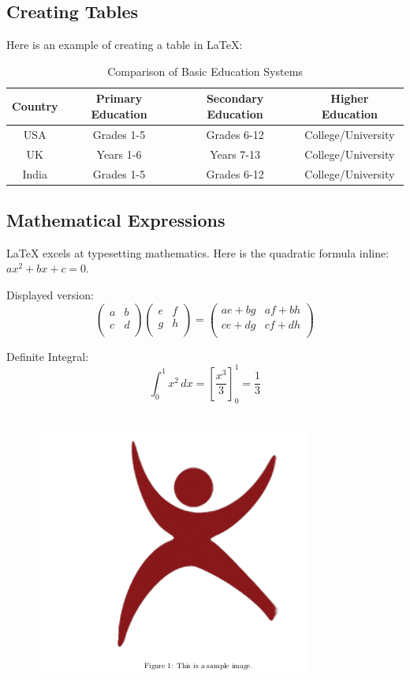 \documentclass{article}
\begin{document}
	
	\subsection{Creating Tables}
	Here is an example of creating a table in \LaTeX:
	\begin{table}[h]
		\centering
		\begin{tabular}{|c|c|c|c|}
			\hline
			Country & Primary Education & Secondary Education  &  Higher Education\\
			\hline
			USA & Grades 1-5 & Grades 6-12 & College/University \\
			\hline
			UK & Years 1-6 & Years 7-13 & College/University\\
			\hline
			India & Grades 1-5 & Grades 6-12& College/University \\
			\hline
		\end{tabular}
		\caption{Comparison of Basic Education Systems}
	\end{table}
		
	
	\subsection{Mathematical Expressions}
	LaTeX excels at typesetting mathematics. Here is the quadratic formula inline: \( ax^2 + bx + c = 0 \).
	
	Displayed version: 
	\[
	\begin{pmatrix}
		a & b \\
		c & d \\
	\end{pmatrix}
	\begin{pmatrix}
		e & f \\
		g & h \\
	\end{pmatrix}
	=
	\begin{pmatrix}
		ae + bg & af + bh \\
		ce + dg & cf + dh \\
	\end{pmatrix}
	\]
	
	Definite Integral:
	\[
	\int_0^1 x^2 \, dx = \left[ \frac{x^3}{3} \right]_0^1 = \frac{1}{3}
	\]\\
	\begin{figure}
		
		\includegraphics{r.jpeg}
	\end{figure}
\end{document}
